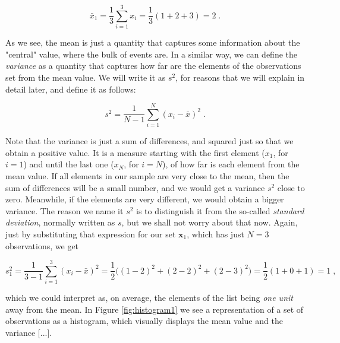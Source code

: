 \documentclass{book}
\begin{document}
\begin{equation}
\bar{x}_{1} = \frac{1}{3} \sum_{i = 1}^{3} x_{i} = \frac{1}{3} (1 + 2 + 3) = 2 \; . \nonumber
\end{equation}

As we see, the mean is just a quantity that captures some information about the "central" value, where the bulk of events are. In a similar way, we can define the \textit{variance} as a quantity that captures how far are the elements of the observations set from the mean value. We will write it as $s^2$, for reasons that we will explain in detail later, and define it as follows:

\begin{equation}
s^2 = \frac{1}{N - 1} \sum_{i = 1}^{N} (x_{i} - \bar{x})^{2} \; . 
\end{equation}

Note that the variance is just a sum of differences, and squared just so that we obtain a positive value. It is a measure starting with the first element ($x_1$, for $i = 1$) and until the last one ($x_N$, for $i = N$), of how far is each element from the mean value. If all elements in our sample are very close to the mean, then the sum of differences will be a small number, and we would get a variance $s^2$ close to zero. Meanwhile, if the elements are very different, we would obtain a bigger variance. The reason we name it $s^2$ is to distinguish it from the so-called \textit{standard deviation}, normally written as $s$, but we shall not worry about that now. Again, just by substituting that expression for our set $\textbf{x}_1$, which has just $N = 3$ observations, we get

\begin{equation}
s_1^2 = \frac{1}{3 - 1} \sum_{i = 1}^{3} (x_{i} - \bar{x})^{2} = \frac{1}{2} \big((1 - 2)^{2} + (2 - 2)^{2} + (2 - 3)^{2}\big) = \frac{1}{2} (1 + 0 + 1) = 1 \; , \nonumber
\end{equation}

which we could interpret as, on average, the elements of the list being \textit{one unit} away from the mean. In Figure \ref{fig:histogram1} we see a representation of a set of observations as a histogram, which visually displays the mean value and the variance [...]. \\
\end{document}
